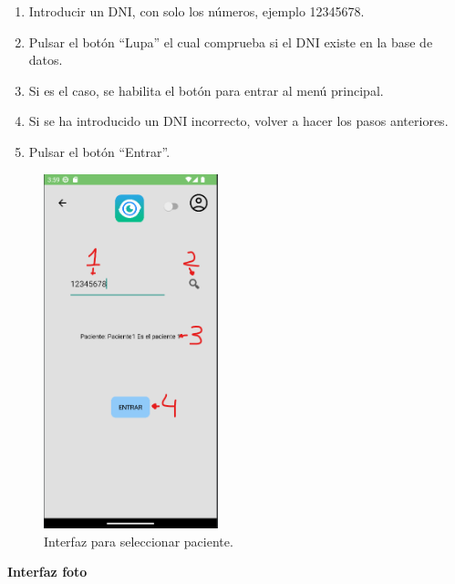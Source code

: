 \begin{enumerate}
    \def\labelenumi{\arabic{enumi}.}
    \tightlist
    \item Introducir un DNI, con solo los números, ejemplo 12345678.
    \item Pulsar el botón ``Lupa'' el cual comprueba si el DNI existe en la base de datos.
    \item Si es el caso, se habilita el botón para entrar al menú principal.
    \item Si se ha introducido un DNI incorrecto, volver a hacer los pasos anteriores.
    \item Pulsar el botón ``Entrar''.
    
\end{enumerate}
\begin{figure}[!ht]
         \centering
         \includegraphics[width=0.45\textwidth]{img/Interfaz seleccionar Paciente.png}
         \caption{Interfaz para seleccionar paciente.}
         \label{fig:InterfazSeleccionarPaciente}
\end{figure}

\textbf{Interfaz foto}


